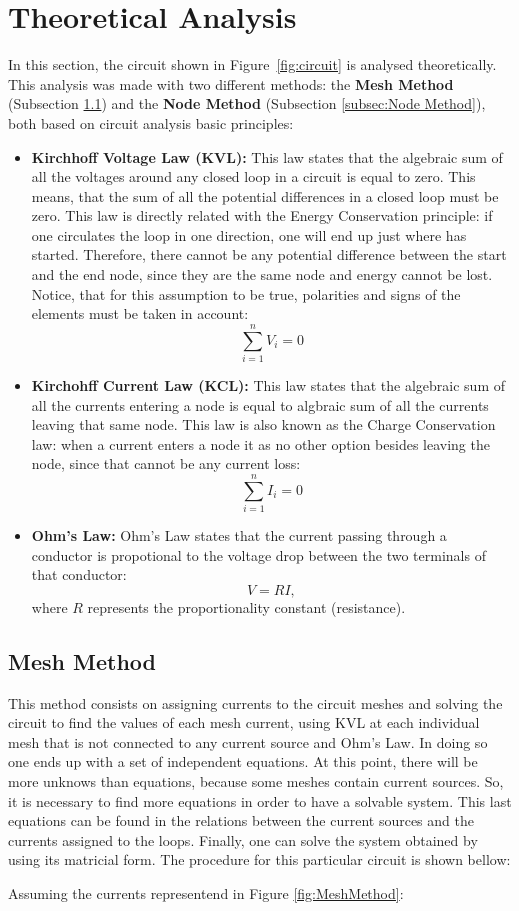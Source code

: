 \section{Theoretical Analysis}
\label{sec:analysis}

In this section, the circuit shown in Figure~\ref{fig:circuit} is analysed
theoretically. This analysis was made with two different methods: the \textbf{Mesh Method} (Subsection \ref{subsec:Mesh Method}) and the \textbf{Node Method} (Subsection \ref{subsec:Node Method}), both based on circuit analysis basic principles:
\begin{itemize}
\item \textbf{Kirchhoff Voltage Law (KVL):} This law states that the algebraic sum of all the voltages around any closed loop in a circuit is equal to zero. This means, that the sum of all the potential differences in a closed loop must be zero. This law is directly related with the Energy Conservation principle: if one circulates the loop in one direction, one will end up just where has started. Therefore, there cannot be any potential difference between the start and the end node, since they are the same node and energy cannot be lost. Notice, that for this assumption to be true, polarities and signs of the elements must be taken in account:$$\sum_{i=1}^{n}V_{i}=0$$
\item \textbf{Kirchohff Current Law (KCL):} This law states that the algebraic sum of all the currents entering a node is equal to algbraic sum of all the currents leaving that same node. This law is also known as the Charge Conservation law: when a current enters a node it as no other option besides leaving the node, since that cannot be any current loss: $$\sum_{i=1}^{n}I_{i}=0$$
  \item \textbf{Ohm's Law:} Ohm's Law states that the current passing through a conductor is propotional to the voltage drop between the two terminals of that conductor: $$V = RI,$$ where $R$ represents the proportionality constant (resistance). 
  
\end{itemize}


\subsection{Mesh Method}
\label{subsec:Mesh Method}\par
This method consists on assigning currents to the circuit meshes and solving the circuit to find the values of each mesh current, using KVL at each individual mesh that is not connected to any current source and Ohm's Law. In doing so one ends up with a set of independent equations. At this point, there will be more unknows than equations, because some meshes contain current sources. So, it is necessary to find more equations in order to have a solvable system. This last equations can be found in the relations between the current sources and the currents assigned to the loops. Finally, one can solve the system obtained by using its matricial form. The procedure for this particular circuit is shown bellow:\par
Assuming the currents representend in Figure \ref{fig:MeshMethod}:

